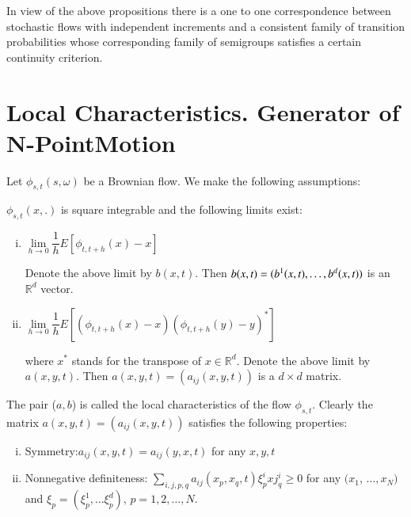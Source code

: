 \setcounter{remark}{3}
\begin{remark}\label{c1:rem1.1.4} %
   In view of the above propositions there is a one to one
   correspondence between stochastic flows with independent increments
   and a consistent family of transition probabilities whose
   corresponding family of semigroups satisfies a certain continuity
   criterion. 
\end{remark}

\section[Local Characteristics. Generator of N-Point Motion]
{Local Characteristics. Generator of N-Point\hfill\break Motion}\label{chap1:sec1.2}
  
Let $\phi_{s,t}(s, \omega)$ be a Brownian flow. We make the following
assumptions: 	 


\begin{Assumption}\label{c1:asm1} %
  $\phi_{s,t}(x,. )$ is square integrable and the following limits exist:  
\begin{enumerate}[(i)]
\item $\lim\limits_{h \rightarrow 0} \dfrac{1}{h} E [\phi_{t,t+h} (x)-x]$

  Denote the above limit by $b(x,t)$. Then $b(x,t) = (b^1(x,t), \ldots,\break
  b^d(x,t))$ is an $\mathbb{R}^d$ vector. 

\item $\lim\limits_{h \rightarrow 0} \dfrac{1}{h} E [(\phi_{t,t+h}
  (x)-x) (\phi_{t,t+h} (y)-y)^*]$ 

  where $x^*$ stands for the transpose of $x \in
  \mathbb{R}^d$. Denote the above limit by $a(x,y,t)$. Then $a(x,y,t)
  = (a_{ij}(x,y,t))$ is a $d \times d$ matrix. 
\end{enumerate}

  The pair ($a,b$) is called the local characteristics of the flow
  $\phi_{s,t}$. Clearly the matrix $a(x,y,t) = (a_{ij}(x,y,t))$
  satisfies the following properties:  
\begin{enumerate}[(i)]
\item Symmetry:\pageoriginale  $a_{ij}(x,y,t) = a_{ij}(y,x,t)$ for any $x, y,t$

\item Nonnegative definiteness:  $\sum\limits_{i,j,p,q}
  a_{ij}(x_p,x_q, t) \xi^i_p xj^i_q \ge 0$ for any $(x_1$, $\ldots,  x_N)$
  and $\xi_p = (\xi^1_p, \ldots \xi^d_p), \, p = 1,2, \ldots, N$. 
\end{enumerate}  
\end{Assumption}

